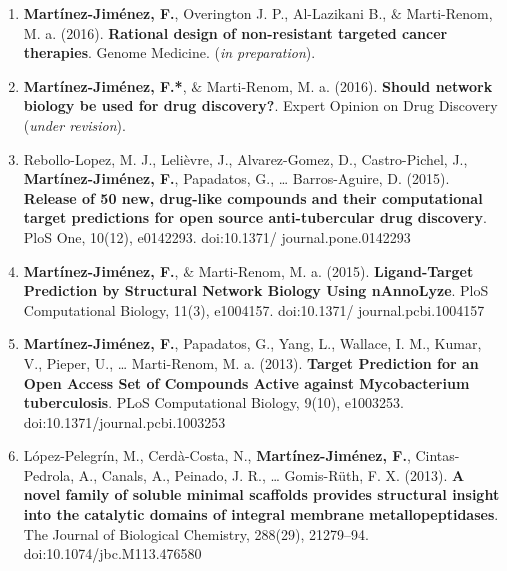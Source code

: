 \documentclass[11pt, b5paper,twoside]{tesi_upf}
\begin{document}
\begin{enumerate}

\item  \textbf{Martínez-Jiménez, F.}, Overington J. P., Al-Lazikani B., $\&$ Marti-Renom, M. a. (2016). \textbf{Rational design of non-resistant targeted cancer therapies}. Genome Medicine.  (\textit{in preparation}). 

\item \textbf{Martínez-Jiménez, F.*}, $\&$ Marti-Renom, M. a. (2016). \textbf{Should network biology be used for drug discovery?}. Expert Opinion on Drug Discovery (\textit{under revision}). 

\item Rebollo-Lopez, M. J., Lelièvre, J., Alvarez-Gomez, D., Castro-Pichel, J., \textbf{Martínez-Jiménez, F.}, Papadatos, G., … Barros-Aguire, D. (2015). \textbf{Release of 50 new, drug-like compounds and their computational target predictions for open source anti-tubercular drug discovery}. PloS One, 10(12), e0142293. doi:10.1371/ journal.pone.0142293

\item \textbf{Martínez-Jiménez, F.}, $\&$ Marti-Renom, M. a. (2015). \textbf{Ligand-Target Prediction by Structural Network Biology Using nAnnoLyze}. PloS Computational Biology, 11(3), e1004157. doi:10.1371/ journal.pcbi.1004157

\item \textbf{Martínez-Jiménez, F.}, Papadatos, G., Yang, L., Wallace, I. M., Kumar, V., Pieper, U., … Marti-Renom, M. a. (2013). \textbf{Target Prediction for an Open Access Set of Compounds Active against Mycobacterium tuberculosis}. PLoS Computational Biology, 9(10), e1003253. doi:10.1371/journal.pcbi.1003253

\item López-Pelegrín, M., Cerdà-Costa, N., \textbf{Martínez-Jiménez, F.}, Cintas-Pedrola, A., Canals, A., Peinado, J. R., … Gomis-Rüth, F. X. (2013). \textbf{A novel family of soluble minimal scaffolds provides structural insight into the catalytic domains of integral membrane metallopeptidases}. The Journal of Biological Chemistry, 288(29), 21279–94. doi:10.1074/jbc.M113.476580

\end{enumerate}



\end{document}
